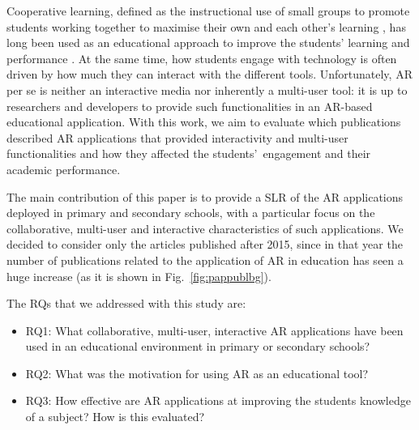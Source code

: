 Cooperative learning, defined as the instructional use of small groups to promote students working together to maximise their own and each other's learning \citep{johnson1991cooperation}, has long been used as an educational approach to improve the students' learning and performance \citep{johnson2008active, kuh2011piecing}. At the same time, how students engage with technology is often driven by how much they can interact with the different tools. Unfortunately, AR per se is neither an interactive media nor inherently a multi-user tool: it is up to researchers and developers to provide such functionalities in an AR-based educational application. With this work, we aim to evaluate which publications described AR applications that provided interactivity and multi-user functionalities and how they affected the students'\ engagement and their academic performance.

The main contribution of this paper is to provide a \gls{SLR} of the \gls{AR} applications deployed in primary and secondary schools, with a particular focus on the collaborative, multi-user and interactive characteristics of such applications. We decided to consider only the articles published after 2015, since in that year the number of publications related to the application of \gls{AR} in education has seen a huge increase (as it is shown in Fig.~\ref{fig:pappublbg}).

The \glspl{RQ} that we addressed with this study are:
\begin{itemize}
    \item \gls{RQ}1: What collaborative, multi-user, interactive \gls{AR} applications have been used in an educational environment in primary or secondary schools?
    \item \gls{RQ}2: What was the motivation for using \gls{AR} as an educational tool?
    \item \gls{RQ}3: How effective are \gls{AR} applications at improving the students knowledge of a subject? How is this evaluated?
\end{itemize}

